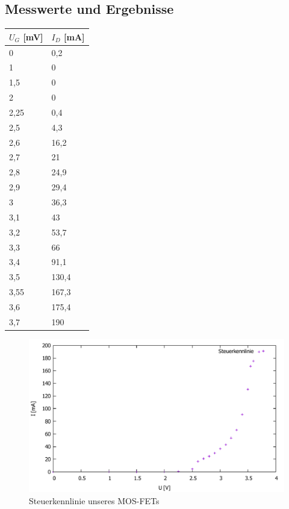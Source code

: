 \documentclass{scrartcl}
\begin{document}
\subsection{Messwerte und Ergebnisse}
\begin{table}[H]
\begin{center}
\begin{tabular}{l|l}

$U_G$ [mV]   &   $I_D$ [mA] \\
\hline
0	&0,2\\
1	&0\\
1,5	&0\\
2	&0\\
2,25&	0,4\\
2,5	&4,3\\
2,6	&16,2\\
2,7	&21\\
2,8	&24,9\\
2,9	&29,4\\
3	&36,3\\
3,1	&43\\
3,2	&53,7\\
3,3	&66\\
3,4	&91,1\\
3,5	&130,4\\
3,55&	167,3\\
3,6	&175,4\\
3,7	&190\\
\end{tabular}
\end{center}
\label{tab:mosfet_UG}
\end{table}
\begin{figure}[H]
  \centering
    \includegraphics[scale=0.5]{v4_steuer.pdf}
  \caption{Steuerkennlinie unseres MOS-FETs}
  \label{fig:Kennlinie_M_Gate}
\end{figure}
\end{document}
